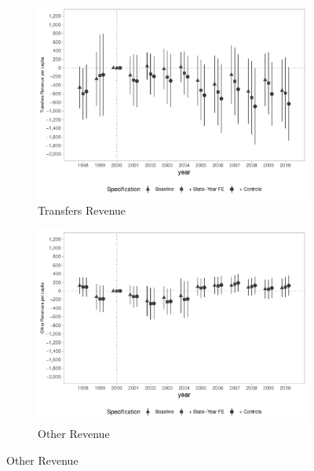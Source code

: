 \begin{figure}[h]
\begin{center}
\begin{subfigure}{0.49\textwidth}
    \end{subfigure}
    \begin{subfigure}{0.49\textwidth}
        \centering
        \caption{\scriptsize Transfers Revenue}\label{fig:rev1_c}
        \includegraphics[width=\textwidth]{plots/spending/finbra_rectransf_pcapita_dist_ec29_baseline_dist_ec29_baseline_full.pdf}
    \end{subfigure}
    \begin{subfigure}{0.49\textwidth}
        \centering
        \caption{\scriptsize Other Revenue}\label{fig:rev1_d}
        \includegraphics[width=\textwidth]{plots/spending/finbra_rec_outros_pcapita_dist_ec29_baseline_dist_ec29_baseline_full.pdf}
    \end{subfigure}
    
    \end{center}
    
\end{figure}

